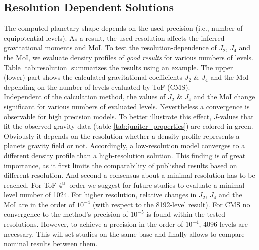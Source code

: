 \documentclass[usenatbib]{mnras}
\begin{document}
\subsection{Resolution Dependent Solutions} \label{subsection:resoltution_dependence}
The computed planetary shape depends on the used precision (i.e., number of equipotential levels). 
As a result, the used resolution affects the inferred gravitational moments and MoI. 
To test the resolution-dependence of $J_2$, $J_4$ and the MoI, we evaluate density profiles of \textit{good results} for various numbers of levels. 
Table \ref{tab:resolution} summarizes the results using an example. The upper (lower) part shows the calculated gravitational coefficients $J_2$ \& $J_4$ and the MoI depending on the number of levels evaluated by ToF (CMS). \\
Independent of the calculation method, the values of $J_2$ \& $J_4$ and the MoI change significant for various numbers of evaluated levels. Nevertheless a convergence is observable for high precision models. To better illustrate this effect, $J$-values that fit the observed gravity data (table \ref{tab:jupiter_properties}) are colored in green. 
Obviously it depends on the resolution whether a density profile represents a planets gravity field or not. Accordingly, a low-resolution model converges to a different density profile than a high-resolution solution. This finding is of great importance, as it first limits the comparability of published results based on different resolution. And second a consensus about a minimal resolution has to be reached. For ToF 4$^{\text{th}}$-order we suggest for future studies to evaluate a minimal level number of 1024. For higher resolution, relative changes in $J_2$, $J_4$ and the MoI are in the order of $10^{-4}$ (with respect to the 8192-level result). For CMS no convergence to the method's precision of $10^{-5}$ is found within the tested resolutions. However, to achieve a precision in the order of $10^{-4}$, 4096 levels are necessary. This will set studies on the same base and finally allows to compare nominal results between them. %
\end{document}
